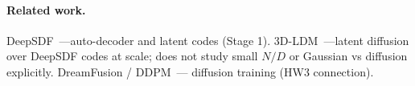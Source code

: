 \paragraph{Related work.} DeepSDF~\citep{park2019deepsdf}---auto-decoder and
latent codes (Stage 1). 3D-LDM~\citep{nam2022lion3dldm}---latent diffusion over
DeepSDF codes at scale; does not study small $N/D$ or Gaussian vs diffusion
explicitly. DreamFusion / DDPM~\citep{poole2022dreamfusion, ho2020ddpm}---
diffusion training (HW3 connection).
